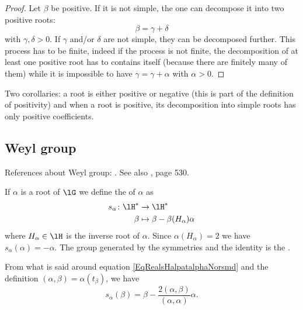 \begin{proof}
    Let \( \beta\) be positive. If it is not simple, the one can decompose it into two positive roots:
    \begin{equation}
        \beta=\gamma+\delta
    \end{equation}
    with \( \gamma,\delta>0\). If \( \gamma\) and/or \( \delta\) are not simple, they can be decomposed further. This process has to be finite, indeed if the process is not finite, the decomposition of at least one positive root has to contains itself (because there are finitely many of them) while it is impossible to have \( \gamma=\gamma+\alpha\) with \( \alpha>0\).
\end{proof}

Two corollaries: a root is either positive or negative (this is part of the definition of positivity) and when a root is positive, its decomposition into simple roots has only positive coefficients.


\subsection{Weyl group}
References about Weyl group: \cite{Knapp_reprez}. See also \cite{Cornwell}, page 530.

If \( \alpha\) is a root of \( \lG\) we define the  of \( \alpha\) as
\begin{equation}
    \begin{aligned}
        s_{\alpha}\colon \lH^*&\to \lH^* \\
        \beta&\mapsto \beta-\beta(H_{\alpha})\alpha
    \end{aligned}
\end{equation}
where \( H_{\alpha}\in\lH\) is the inverse root of \( \alpha\). Since \( \alpha(H_{\alpha})=2\) we have \( s_{\alpha}(\alpha)=-\alpha\). The group generated by the symmetries and the identity is the .

From what is said around equation \eqref{EqRealsHalpatalphaNorsmd} and the definition \( (\alpha,\beta)=\alpha(t_{\beta})\), we have
\begin{equation}
    s_{\alpha}(\beta)=\beta-\frac{ 2(\alpha,\beta) }{ (\alpha,\alpha) }\alpha.
\end{equation}

